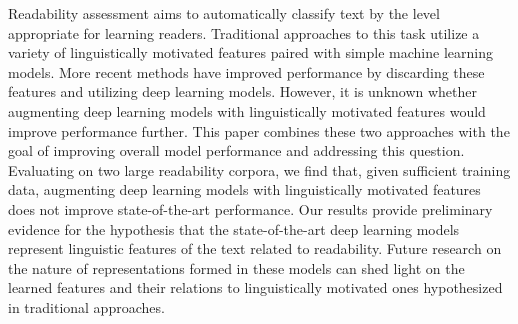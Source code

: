 Readability assessment aims to automatically classify text by the level appropriate for learning readers. Traditional approaches to this task utilize a variety of linguistically motivated features paired with simple machine learning models. More recent methods have improved performance by discarding these features and utilizing deep learning models. However, it is unknown whether augmenting deep learning models with linguistically motivated features would improve performance further. This paper combines these two approaches with the goal of improving overall model performance and addressing this question. Evaluating on two large readability corpora, we find that, given sufficient training data, augmenting deep learning models with linguistically motivated features does not improve state-of-the-art performance. Our results provide preliminary evidence for the hypothesis that the state-of-the-art deep learning models represent linguistic features of the text related to readability. Future research on the nature of representations formed in these models can shed light on the learned features and their relations to linguistically motivated ones hypothesized in traditional approaches.

